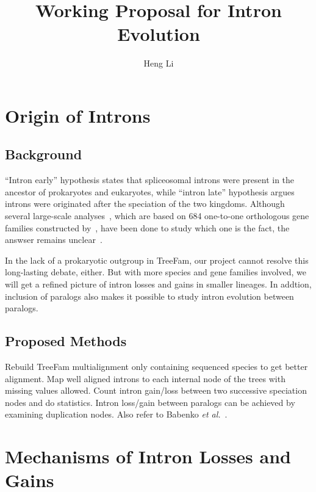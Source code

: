
\usepackage{bioinformatics}


\title{Working Proposal for Intron Evolution}
\author{Heng Li}


\maketitle

\section{Origin of Introns}

\subsection{Background}
``Intron early'' hypothesis states that
spliceosomal introns were present in the ancestor of prokaryotes and eukaryotes,
while ``intron late'' hypothesis argues introns were originated after the
speciation of the two kingdoms. Although several large-scale
analyses~\cite{roy05,nguyen05}, which are based on 684 one-to-one orthologous
gene families constructed by~\cite{rogozin03}, have been done to study which one is the fact,
the answser remains unclear~\cite{rogozin05}.

In the lack of a prokaryotic outgroup in TreeFam, our project cannot resolve
this long-lasting debate, either. But with more species and gene families involved,
we will get a refined picture of intron losses and gains in smaller lineages.
In addtion, inclusion of paralogs also makes it possible to study intron
evolution between paralogs.

\subsection{Proposed Methods}
Rebuild TreeFam multialignment only containing sequenced species to get better alignment. Map
well aligned introns to each internal node of the trees with missing values allowed. Count
intron gain/loss between two successive speciation nodes and do statistics. Intron loss/gain
between paralogs can be achieved by examining duplication nodes. Also refer to
Babenko {\it et al.}~\cite{babenko04}.

\section{Mechanisms of Intron Losses and Gains}

